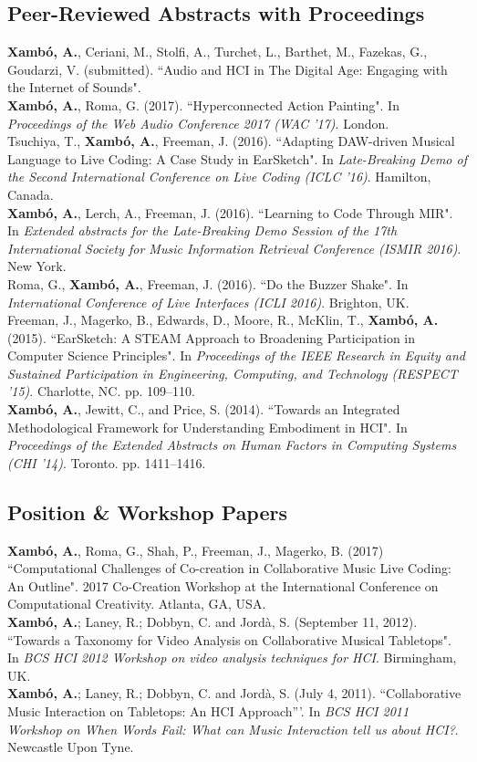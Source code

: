\documentclass[10pt, a4paper]{article}
\newcommand{\years}[1]{\marginnote{\scriptsize #1}}
\begin{document}
\subsection*{Peer-Reviewed Abstracts with Proceedings}
\noindent
\years{2017}\textbf{Xambó, A.}, Ceriani, M., Stolfi, A., Turchet, L., Barthet, M., Fazekas, G., Goudarzi, V. (submitted). “Audio and HCI in The Digital Age: Engaging with the Internet of Sounds".\\
\years{2017}\textbf{Xambó, A.}, Roma, G. (2017). “Hyperconnected Action Painting". In \emph{Proceedings of the Web Audio Conference 2017 (WAC '17)}. London.\\
\years{2016c}Tsuchiya, T., \textbf{Xambó, A.}, Freeman, J. (2016). “Adapting DAW-driven Musical Language to Live Coding: A Case Study in EarSketch". In \emph{Late-Breaking Demo of the Second International Conference on Live Coding (ICLC '16)}. Hamilton, Canada.\\ 
\years{2016b}\textbf{Xambó, A.}, Lerch, A., Freeman, J. (2016). “Learning to Code Through MIR". In \emph{Extended abstracts for the Late-Breaking Demo Session of the 17th International Society for Music Information Retrieval Conference (ISMIR 2016)}. New York.\\
\years{2016a}Roma, G., \textbf{Xambó, A.}, Freeman, J. (2016). “Do the Buzzer Shake". In \emph{International Conference of Live Interfaces (ICLI 2016)}. Brighton, UK.\\
\years{2015}Freeman, J., Magerko, B., Edwards, D., Moore, R., McKlin, T., \textbf{Xambó, A.} (2015). “EarSketch: A STEAM Approach to Broadening Participation in Computer Science Principles". In \emph{Proceedings of the IEEE Research in Equity and Sustained Participation in Engineering, Computing, and Technology (RESPECT '15)}. Charlotte, NC. pp. 109--110.\\
\years{2014}\textbf{Xambó, A.}, Jewitt, C., and Price, S. (2014). “Towards an Integrated Methodological Framework for Understanding Embodiment in HCI". In \emph{Proceedings of the Extended Abstracts on Human Factors in Computing Systems (CHI '14)}. Toronto. pp. 1411--1416.

\subsection*{Position \& Workshop Papers}
\noindent

\years{2017}\textbf{Xambó, A.}, Roma, G., Shah, P., Freeman, J., Magerko, B. (2017) “Computational Challenges of Co-creation in Collaborative Music Live Coding: An Outline". 2017 Co-Creation Workshop at the International Conference on Computational Creativity. Atlanta, GA, USA.\\ 
\years{2012}\textbf{Xambó, A.}; Laney, R.; Dobbyn, C. and Jordà, S. (September 11, 2012). “Towards a Taxonomy for Video Analysis on Collaborative Musical Tabletops". In \emph{BCS HCI 2012 Workshop on video analysis techniques for HCI}. Birmingham, UK.\\
\years{2011}\textbf{Xambó, A.}; Laney, R.; Dobbyn, C. and Jordà, S. (July 4, 2011). ``Collaborative Music Interaction on Tabletops: An HCI Approach'''. In \emph{BCS HCI 2011 Workshop on When Words Fail: What can Music Interaction tell us about HCI?}. Newcastle Upon Tyne.
\end{document}
